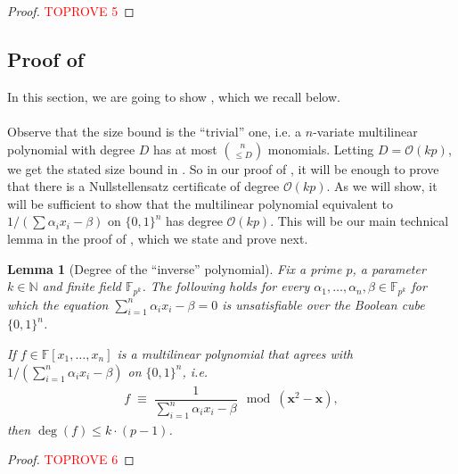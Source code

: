 \documentclass[11pt]{article}
\newtheorem{lemma}[theorem]{Lemma}
\newcommand{\Boo}{\{0,1 \}}
\newcommand{\bigO}{\mathcal{O}}
\newcommand{\F}{\mathbb{F}}
\begin{document}
\ubdnonmlposchar*

\begin{proof}\textcolor{red}{TOPROVE 5}\end{proof}







\subsection{Proof of }\label{subsec:proof-ub-degree}
In this section, we are going to show , which we recall below.\\

\degreeupperbound*

\paragraph{}Observe that the size bound is the ``trivial'' one, i.e. a $n$-variate multilinear polynomial with degree $D$ has at most $\binom{n}{\leq D}$ monomials. Letting $D = \bigO(kp)$, we get the stated size bound in . So in our proof of , it will be enough to prove that there is a Nullstellensatz certificate of degree $\bigO(kp)$. As we will show, it will be sufficient to show that the multilinear polynomial equivalent to $1/(\sum \alpha_{i} x_{i} - \beta)$ on $\Boo^{n}$ has degree $\bigO(kp)$. This will be our main technical lemma in the proof of , which we state and prove next.\\


\begin{lemma}[Degree of the ``inverse'' polynomial]\label{lemma:deg-inverse-poly}
Fix a prime $p$, a parameter $k \in \mathbb{N}$ and finite field $\F_{p^{k}}$. The following holds for every $\alpha_{1},\ldots,\alpha_{n},\beta \in \F_{p^{k}}$ for which the equation $\sum_{i=1}^{n} \alpha_{i} x_{i} - \beta = 0$ is unsatisfiable over the Boolean cube $\Boo^{n}$.\newline

If $f \in \F[x_{1},\ldots,x_{n}]$ is a multilinear polynomial that agrees with $1/(\sum_{i=1}^{n} \alpha_{i}x_{i} - \beta)$ on $\Boo^{n}$, i.e.
\begin{align*}
    f \; \equiv \; \dfrac{1}{\sum_{i=1}^{n} \alpha_{i} x_{i} - \beta} \mod{(\mathbf{x}^{2} - \mathbf{x})},
\end{align*}
then $\deg(f) \leq k \cdot (p-1)$.
\end{lemma}
\begin{proof}\textcolor{red}{TOPROVE 6}\end{proof}
\end{document}
